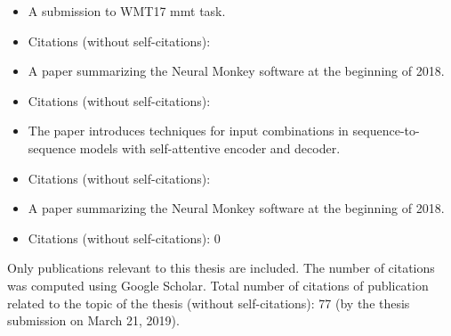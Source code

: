
\newpage
\noindent{}
\begin{itemize}[noitemsep,topsep=0pt]

\item A submission to WMT17 \gls{mmt} task.

  \item Citations (without self-citations): 

\end{itemize}\vspace{3mm}


\noindent{}
\begin{itemize}[noitemsep,topsep=0pt]

  \item A paper summarizing the Neural Monkey software at the beginning of
      2018.

  \item Citations (without self-citations): 

\end{itemize}\vspace{3mm}


\noindent{}
\begin{itemize}[noitemsep,topsep=0pt]

  \item The paper introduces techniques for input combinations in
      sequence-to-sequence models with self-attentive encoder and decoder.

  \item Citations (without self-citations): 

\end{itemize}\vspace{3mm}


\noindent{}
\begin{itemize}[noitemsep,topsep=0pt]

  \item A paper summarizing the Neural Monkey software at the beginning of
      2018. 

  \item Citations (without self-citations): 0

\end{itemize}\vspace{3mm}

\vspace{1cm}

\noindent Only publications relevant to this thesis are included. The number of
citations was computed using Google Scholar. Total number of citations of
publication related to the topic of the thesis (without self-citations):
{\large 77} (by the thesis submission on March 21, 2019).
